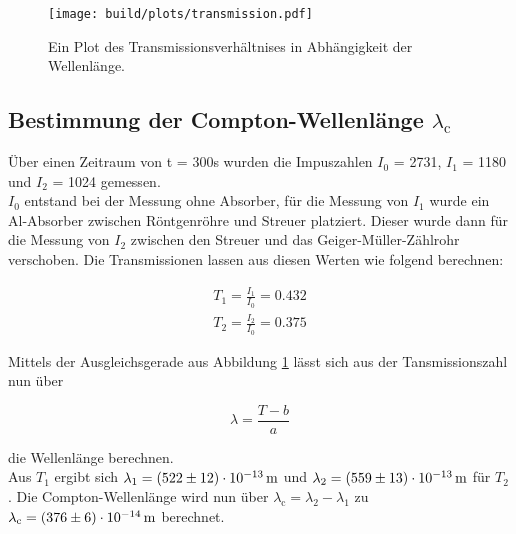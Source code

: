             \begin{figure}[h]
                \centering
                \texttt{[image: build/plots/transmission.pdf]}
                \caption{Ein Plot des Transmissionsverhältnises in Abhängigkeit der Wellenlänge.}
                \label{img:Trans}
            \end{figure}

    \subsection{Bestimmung der Compton-Wellenlänge \texorpdfstring{$\lambda_{\text{c}}$}{TEXT}}

        \noindent Über einen Zeitraum von t = 300s wurden die Impuszahlen $I_0$ = 2731, $I_1$ = 1180 und $I_2$ = 1024 gemessen.\\
        $I_0$ entstand bei der Messung ohne Absorber, für die Messung von $I_1$ wurde ein Al-Absorber zwischen Röntgenröhre und 
        Streuer platziert. Dieser wurde dann für die Messung von $I_2$ zwischen den Streuer und das Geiger-Müller-Zählrohr verschoben.
        Die Transmissionen lassen aus diesen Werten wie folgend berechnen:

            \begin{align}
                T_1 = \frac{I_1}{I_0} = 0.432   \nonumber\\
                T_2 = \frac{I_2}{I_0} = 0.375   \nonumber
            \end{align}

        \noindent Mittels der Ausgleichsgerade aus Abbildung \ref{img:Trans} lässt sich aus der Tansmissionszahl nun über 
            
            \begin{equation*}
                \lambda = \frac{T - b}{a}
            \end{equation*}

        \noindent die Wellenlänge berechnen.\\
        Aus $T_1$ ergibt sich $\lambda_1 = \SI{522 (12)e-13}{\meter}$ und $\lambda_2 = 
        \SI{559  (13)e-13}{\meter}$ für $T_2$. Die Compton-Wellenlänge wird nun über $\lambda_{\text{c}} = \lambda_2 - \lambda_1$ zu 
        $\lambda_{\text{c}} = \SI{376 (6) e-14}{\meter}$ berechnet.

            

    


    
